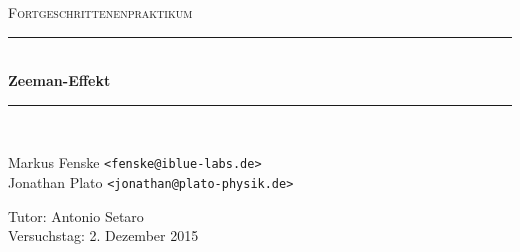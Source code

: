 \newcommand{\HRule}{\rule{\linewidth}{0.5mm}}
\renewcommand\contentsname{}

\begin{center}
  \textsc{\Large Fortgeschrittenenpraktikum}
  \HRule\\[0.4 cm]
  {\huge \bfseries Zeeman-Effekt}
  \HRule\\[0.4 cm]

  \begin{minipage}{0.60\textwidth}
  \begin{flushleft}
    Markus Fenske \texttt{<fenske@iblue-labs.de>} \\
    Jonathan Plato \texttt{<jonathan@plato-physik.de>}
  \end{flushleft}
  \end{minipage}
  \hfill
  \begin{minipage}{0.35\textwidth}
  \begin{flushright}
    Tutor: Antonio Setaro \\
    Versuchstag: 2. Dezember 2015
  \end{flushright}
  \end{minipage}

  \renewcommand{\baselinestretch}{1.45}\normalsize
  \tableofcontents
  \renewcommand{\baselinestretch}{1.0}\normalsize


  \vfill
\end{center}
\newpage
